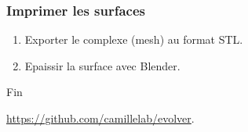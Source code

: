 \documentclass{beamer}
\begin{document}
\begin{frame}
\frametitle{Imprimer les surfaces}
	\begin{enumerate}
		\item<2-> Exporter le complexe (mesh) au format STL.
		\item<3-> Epaissir la surface avec Blender.
	\end{enumerate}
\end{frame}

\begin{frame}
\begin{center}
\Huge{Fin}\\
\strut\newline
\normalsize{\url{https://github.com/camillelab/evolver}.}
\end{center}
\end{frame}
\end{document}
